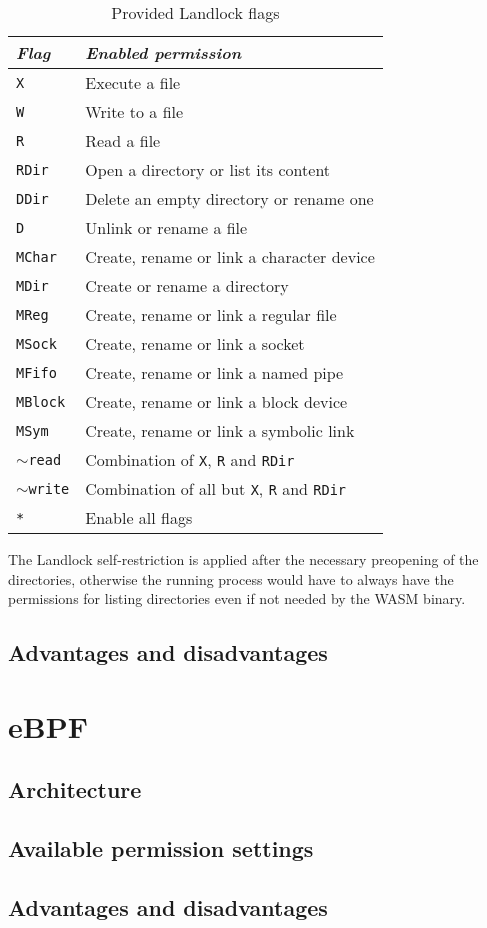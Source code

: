 \begin{table}
  \centering
  \begin{tabular}{|l|l|}
    \hline
    \textit{Flag} & \textit{Enabled permission} \\ \hline\hline
    \texttt{X} & Execute a file \\ \hline
    \texttt{W} & Write to a file \\ \hline
    \texttt{R} & Read a file \\ \hline
    \texttt{RDir} & Open a directory or list its content \\ \hline
    \texttt{DDir} & Delete an empty directory or rename one \\ \hline
    \texttt{D} & Unlink or rename a file \\ \hline
    \texttt{MChar} & Create, rename or link a character device \\ \hline
    \texttt{MDir} & Create or rename a directory \\ \hline
    \texttt{MReg} & Create, rename or link a regular file \\ \hline
    \texttt{MSock} & Create, rename or link a socket \\ \hline
    \texttt{MFifo} & Create, rename or link a named pipe \\ \hline
    \texttt{MBlock} & Create, rename or link a block device \\ \hline
    \texttt{MSym} & Create, rename or link a symbolic link \\ \hline
    \texttt{$\sim$read} & Combination of \texttt{X}, \texttt{R} and \texttt{RDir} \\ \hline
    \texttt{$\sim$write} & Combination of all but \texttt{X}, \texttt{R} and \texttt{RDir} \\ \hline
    \texttt{*} & Enable all flags \\ \hline
  \end{tabular}
  \caption{Provided Landlock flags}
  \label{table:landlock-flags}
\end{table}

The Landlock self-restriction is applied after the necessary preopening of the directories,
otherwise the running process would have to always have the permissions for listing directories even if
not needed by the WASM binary.

\subsection{Advantages and disadvantages}

\section{eBPF}

\subsection{Architecture}

\subsection{Available permission settings}

\subsection{Advantages and disadvantages}